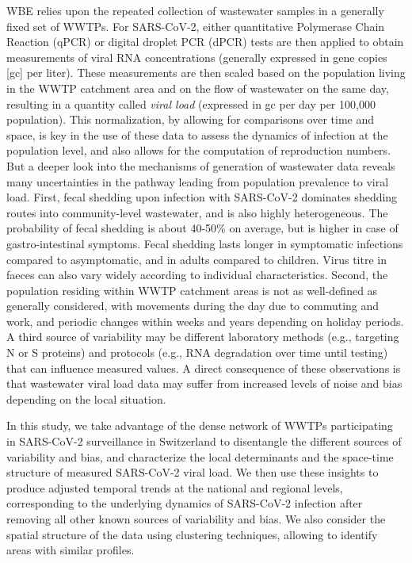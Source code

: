 \documentclass[10pt,letterpaper]{article}
\begin{document}
WBE relies upon the repeated collection of wastewater samples in a generally fixed set of WWTPs.
For SARS-CoV-2, either quantitative Polymerase Chain Reaction (qPCR) or digital droplet PCR (dPCR) tests are then applied to obtain measurements of viral RNA concentrations (generally expressed in gene copies [gc] per liter).  
These measurements are then scaled based on the population living in the WWTP catchment area and on the flow of wastewater on the same day, resulting in a quantity called \textit{viral load} (expressed in gc per day per 100,000 population).
This normalization, by allowing for comparisons over time and space, is key in the use of these data to assess the dynamics of infection at the population level\cite{kirbyUsingWastewaterSurveillance2021,bovenPatternsSARSCoV2Circulation2023,naughtonShowUsData2023}, and also allows for the computation of reproduction numbers\cite{huismanWastewaterBasedEstimationEffective2022}.
But a deeper look into the mechanisms of generation of wastewater data reveals many uncertainties in the pathway leading from  population prevalence to viral load.
First, fecal shedding upon infection with SARS-CoV-2 dominates shedding routes into community-level wastewater, and is also highly heterogeneous.
The probability of fecal shedding is about 40-50\% on average, but is higher in case of gastro-intestinal symptoms\cite{zhangPrevalencePersistentShedding2021,natarajanGastrointestinalSymptomsFecal2022}.
Fecal shedding lasts longer in symptomatic infections compared to asymptomatic, and in adults compared to children\cite{yanCharacteristicsViralShedding2021}.
Virus titre in faeces can also vary widely according to individual characteristics\cite{foladoriSARSCoV2FaecesWastewater2020}.
Second, the population residing within WWTP catchment areas is not as well-defined as generally considered, with movements during the day due to commuting and work, and periodic changes within weeks and years depending on holiday periods.
A third source of variability may be different laboratory methods (e.g., targeting N or S proteins) and protocols (e.g., RNA degradation over time until testing) that can influence measured values\cite{foladoriSARSCoV2FaecesWastewater2020}.
A direct consequence of these observations is that wastewater viral load data may suffer from increased levels of noise and bias depending on the local situation.

In this study, we take advantage of the dense network of WWTPs participating in SARS-CoV-2 surveillance in Switzerland to disentangle the different sources of variability and bias, and characterize the local determinants and the space-time structure of measured SARS-CoV-2 viral load. 
We then use these insights to produce adjusted temporal trends at the national and regional levels, corresponding to the underlying dynamics of SARS-CoV-2 infection after removing all other known sources of variability and bias.
We also consider the spatial structure of the data using clustering techniques, allowing to identify areas with similar profiles.
\end{document}
